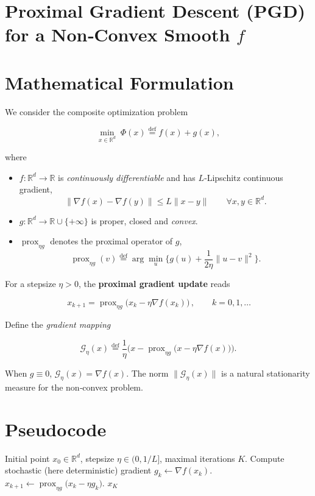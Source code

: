 \documentclass{article}
\begin{document}
\section*{Proximal Gradient Descent (PGD) for a Non‑Convex Smooth $f$}

\section*{Mathematical Formulation}
We consider the composite optimization problem  

\[
\min_{x\in\mathbb{R}^d}\; \Phi(x)\stackrel{\text{def}}{=} f(x)+g(x),
\]

where  

\begin{itemize}[noitemsep]
    \item $f:\mathbb{R}^d\rightarrow\mathbb{R}$ is \emph{continuously differentiable} and has $L$‑Lipschitz continuous gradient,
          \[
          \|\nabla f(x)-\nabla f(y)\|\le L\|x-y\|\qquad\forall x,y\in\mathbb{R}^d .
          \]
    \item $g:\mathbb{R}^d\rightarrow\mathbb{R}\cup\{+\infty\}$ is proper, closed and \emph{convex}.  
    \item $\operatorname{prox}_{\eta g}$ denotes the proximal operator of $g$,
          \[
          \operatorname{prox}_{\eta g}(v)\stackrel{\text{def}}{=}\arg\min_{u}\Big\{ g(u)+\frac{1}{2\eta}\|u-v\|^{2}\Big\}.
          \]
\end{itemize}

For a stepsize $\eta>0$, the \textbf{proximal gradient update} reads  

\[
\boxed{\,x_{k+1}= \operatorname{prox}_{\eta g}\!\big(x_k-\eta\nabla f(x_k)\big)\,},\qquad k=0,1,\dots
\tag{PGD}
\]

Define the \emph{gradient mapping}  

\[
\mathcal{G}_{\eta}(x)\stackrel{\text{def}}{=}\frac{1}{\eta}\Big(x-\operatorname{prox}_{\eta g}\!\big(x-\eta\nabla f(x)\big)\Big).
\tag{1}
\]

When $g\equiv 0$, $\mathcal{G}_{\eta}(x)=\nabla f(x)$. The norm $\|\mathcal{G}_{\eta}(x)\|$ is a natural stationarity measure for the non‑convex problem.

\section*{Pseudocode}
\begin{algorithm}[H]
\caption{Proximal Gradient Descent (PGD)}\label{alg:pgd}
\begin{algorithmic}[1]
\REQUIRE Initial point $x_{0}\in\mathbb{R}^{d}$, stepsize $\eta\in(0,1/L]$, maximal iterations $K$.
    \STATE Compute stochastic (here deterministic) gradient $g_k\gets\nabla f(x_k)$.
    \STATE $x_{k+1}\gets \operatorname{prox}_{\eta g}\!\big(x_k-\eta g_k\big)$.
\ENDFOR
\RETURN $x_{K}$
\end{algorithmic}
\end{algorithm}
\end{document}
